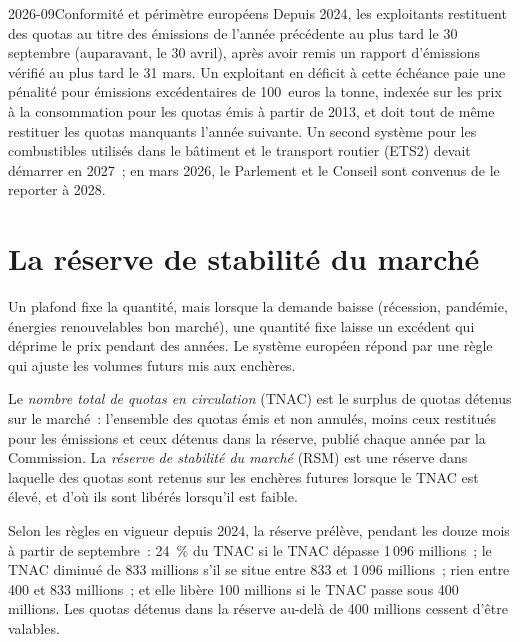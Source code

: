 \begin{dated}{2026-09}{Conformité et périmètre européens}\label{dat:m3:emissions-and-environmental-markets:eu}
Depuis 2024, les exploitants restituent des quotas au titre des émissions de l'année précédente au plus tard le 30 septembre
(auparavant, le 30 avril), après avoir remis un rapport d'émissions vérifié au plus tard le 31 mars. Un exploitant en déficit
à cette échéance paie une pénalité pour émissions excédentaires de 100~euros la tonne, indexée sur les prix à la consommation pour les quotas émis à partir de 2013,
et doit tout de même restituer les quotas manquants l'année suivante. Un second système
pour les combustibles utilisés dans le bâtiment et le transport routier (ETS2) devait démarrer en 2027~; en mars 2026,
le Parlement et le Conseil sont convenus de le reporter à 2028.
\end{dated}

\section{La réserve de stabilité du marché}

Un plafond fixe la quantité, mais lorsque la demande baisse (récession, pandémie, énergies renouvelables bon marché), une
quantité fixe laisse un excédent qui déprime le prix pendant des années. Le système européen
répond par une règle qui ajuste les volumes futurs mis aux enchères.

\begin{definition}\label{def:m3:emissions-and-environmental-markets:msr}
Le \emph{nombre total de quotas en circulation}
(TNAC) est le surplus de quotas détenus sur le marché~: l'ensemble des quotas émis et non
annulés, moins ceux restitués pour les émissions et ceux détenus dans la réserve, publié chaque
année par la Commission. La \emph{réserve de stabilité du marché}
(RSM) est une réserve dans laquelle des quotas sont retenus sur les enchères futures lorsque le TNAC est
élevé, et d'où ils sont libérés lorsqu'il est faible.
\end{definition}

\begin{proposition}\label{prop:m3:emissions-and-environmental-markets:msr}
Selon les règles en vigueur depuis 2024, la réserve prélève, pendant les douze mois à partir de septembre~:
24~\% du TNAC si le TNAC dépasse 1\,096 millions~; le TNAC diminué de 833 millions s'il se situe
entre 833 et 1\,096 millions~; rien entre 400 et 833 millions~; et elle libère 100
millions si le TNAC passe sous 400 millions. Les quotas détenus dans la réserve au-delà de 400 millions
cessent d'être valables.
\end{proposition}

